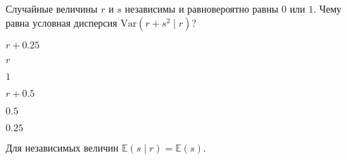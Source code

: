 
\begin{question}
Случайные величины \(r\) и \(s\) независимы и равновероятно равны \(0\) или \(1\).
Чему равна условная дисперсия \(\mathrm{Var}(r + s^2 \mid r)\)?
\begin{answerlist}
  \item \(r + 0.25\)
  \item \(r\)
  \item \(1\)
  \item \(r + 0.5\)
  \item \(0.5\)
  \item \(0.25\)
\end{answerlist}
\end{question}

\begin{solution}
Для независимых величин \(\mathbb E(s \mid r) = \mathbb E(s)\).
\end{solution}

